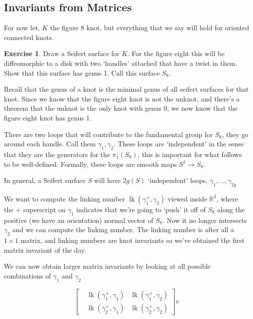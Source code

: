 \documentclass[11pt]{article}
\newcommand{\R}{\mathbb{R}}
\DeclareMathOperator{\lk}{lk}
\theoremstyle{plain}
\theoremstyle{definition}
\newtheorem{exercise}{Exercise}
\begin{document}
\subsection{Invariants from Matrices}

For now let, $K$ the figure 8 knot, but everything that we say will hold for oriented connected knots.


\begin{exercise}
  Draw a Seifert surface for $K$. For the figure eight this will be diffeomorphic to a disk with two `handles' attached that have a twist in them. Show that this surface has genus 1. Call this surface $S_8$.
\end{exercise}

Recall that the genus of a knot is the minimal genus of all seifert surfaces for that knot.
Since we know that the figure eight knot is not the unknot, and there's a theorem that the unknot is the only knot with genus 0, we now know that the figure eight knot has genus 1.

There are two loops that will contribute to the fundamental group for $S_8$, they go around each handle. Call them $\gamma_1, \gamma_2$. These loops are `independent' in the sense that they are the generators for the $\pi_1(S_8)$, this
is important for what follows to be well-defined.
Formally, these loops are smooth maps $S^1 \to S_8$.

In general, a Seifert surface $S$ will have $2g(S)$ `independent' loops, $\gamma_1, \ldots, \gamma_{2g}$

We want to compute the linking number $\lk(\gamma_1^{+}, \gamma_2)$ viewed inside $\R^3$, where the $+$ superscript on $\gamma_1$ indicates that we're going to `push' it off of $S_8$ along the positive
(we have an orientation) normal vector of $S_8$. Now it no longer intersects $\gamma_2$ and we can compute the linking number. The linking number is after all a $1 \times 1$ matrix, and linking numbers are knot invariants so we've
obtained the first matrix invariant of the day.

We can now obtain larger matrix invariants by looking at all possible combinations of $\gamma_1$ and $\gamma_2$


\begin{equation}
\left[
\begin{matrix}
  &\lk(\gamma_1^+, \gamma_1) &\lk(\gamma_1^+, \gamma_2) \\
  &\lk(\gamma_2^+, \gamma_1) &\lk(\gamma_2^+, \gamma_2)
\end{matrix}
\right]v
\end{equation}
\end{document}
